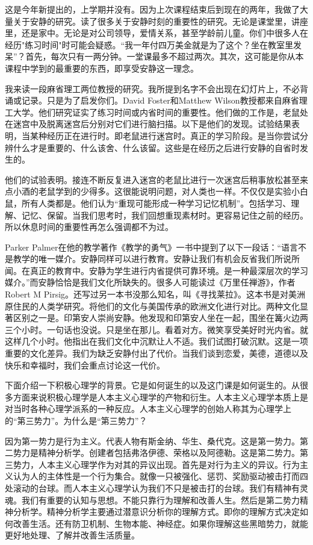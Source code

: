 这是今年新提出的，上学期并没有。因为上次课程结束后到现在的两年，我做了大量关于安静的研究。读了很多关于安静时刻的重要性的研究。无论是课堂里，讲座里，还是家中。无论是对公司领导，爱情关系，甚至学龄前儿童。你们中很多人在经历"练习时间"时可能会疑惑。“我一年付四万美金就是为了这个？坐在教室里发呆”？首先，每次只有一两分钟。一堂课最多不超过两次。其次，这可能是你从本课程中学到的最重要的东西，即享受安静这一理念。

我来读一段麻省理工两位教授的研究。我所提到名字不会出现在幻灯片上，不必背诵或记录。只是为了启发你们。David Foster和Matthew Wilson教授都来自麻省理工大学。他们研究证实了练习时间或内省时间的重要性。他们做的工作是，老鼠处在迷宫中及脱离迷宫后分别对它们进行脑扫描。以下是他们的发现。试验结果表明，当某种经历正在进行时。即老鼠进行迷宫时。真正的学习阶段。是当你尝试分辨什么才是重要的、什么该舍、什么该留。这些是在经历之后进行安静的自省时发生的。

他们的试验表明。接连不断反复进入迷宫的老鼠比进行一次迷宫后稍事放松甚至来点小酒的老鼠学到的少得多。这很能说明问题，对人类也一样。不仅仅是实验小白鼠，所有人类都是。他们认为“重现可能形成一种学习记忆机制”。包括学习、理解、记忆、保留。当我们思考时，我们回想重现素材时。更容易记住之前的经历。所以休息时间的重要性再怎么强调都不为过。

Parker Palmer在他的教学著作《教学的勇气》一书中提到了以下一段话：“语言不是教学的唯一媒介。安静同样可以进行教育。安静让我们有机会反省我们所说所闻。在真正的教育中。安静为学生进行内省提供可靠环境。是一种最深层次的学习媒介。”而安静恰恰是我们文化所缺失的。很多人可能读过《万里任禅游》，作者Robert M Pirsig。还写过另一本书没那么知名，叫《寻找莱拉》。这本书是对美洲原住民的人类学研究。将他们的文化与美国传承的欧洲文化进行对比。两种文化显著区别之一是。印第安人崇尚安静。他发现和印第安人坐在一起，围坐在篝火边两三个小时。一句话也没说。只是坐在那儿。看着对方。微笑享受美好时光内省。就这样几个小时。他指出在我们文化中沉默让人不适。我们试图打破沉默。这是一项重要的文化差异。我们为缺乏安静付出了代价。当我们谈到恋爱，美德，道德以及快乐和幸福时，我们会重点讨论这一代价。

下面介绍一下积极心理学的背景。它是如何诞生的以及这门课是如何诞生的。从很多方面来说积极心理学是人本主义心理学的产物和衍生。人本主义心理学本质上是对当时各种心理学派系的一种反应。人本主义心理学的创始人称其为心理学上的“第三势力”。为什么是“第三势力”？

因为第一势力是行为主义。代表人物有斯金纳、华生、桑代克。这是第一势力。第二势力是精神分析学。创建者包括弗洛伊德、荣格以及阿德勒。这是第二势力。第三势力，人本主义心理学作为对其的异议出现。首先是对行为主义的异议。行为主义认为人的主体性是一个行为集合。就像一只被强化、惩罚、奖励驱动被击打而四处滚动的台球。而人本主义心理学认为我们不只是被击打的台球。我们有精神有灵魂。我们有重要的认知与思想。不能只靠行为理解和改善人生。然后是第二势力精神分析学。精神分析学主要通过潜意识分析你的理解方式。即你的理解方式决定如何改善生活。还有防卫机制、生物本能、神经症。如果你理解这些黑暗势力，就能更好地处理、了解并改善生活质量。

